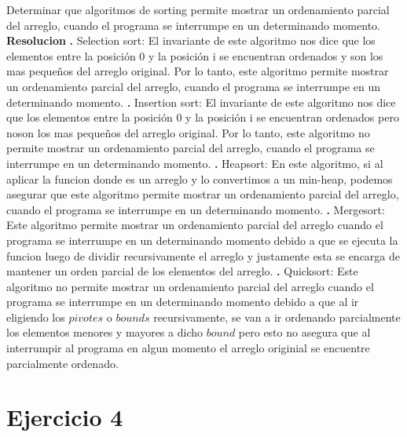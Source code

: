\documentclass[10pt,a4paper]{article}
\begin{document}
Determinar que algoritmos de sorting permite mostrar un ordenamiento parcial del arreglo, cuando el programa se interrumpe en un determinando momento. 
\newline
\newline
\textbf{Resolucion}
\newline
\newline
\textbf{.} Selection sort: El invariante de este algoritmo nos dice que los elementos entre la posición 0 y la posición i se encuentran ordenados y son los mas pequeños del arreglo original. Por lo tanto, este algoritmo permite mostrar un ordenamiento parcial del arreglo, cuando el programa se interrumpe en un determinando momento. 
\newline
\newline
\textbf{.} Insertion sort: El invariante de este algoritmo nos dice que los elementos entre la posición 0 y la posición i se encuentran ordenados pero noson los mas pequeños del arreglo original. Por lo tanto, este algoritmo no permite mostrar un ordenamiento parcial del arreglo, cuando el programa se interrumpe en un determinando momento.
\newline
\newline
\textbf{.} Heapsort: En este algoritmo, si al aplicar la funcion  donde  es un arreglo y lo convertimos a un min-heap, podemos asegurar que este algoritmo permite mostrar un ordenamiento parcial del arreglo, cuando el programa se interrumpe en un determinando momento.
\newline
\newline
\textbf{.} Mergesort: Este algoritmo permite mostrar un ordenamiento parcial del arreglo cuando el programa se interrumpe en un determinando momento debido a que se ejecuta la funcion  luego de dividir recursivamente el arreglo y justamente esta se encarga de mantener un orden parcial de los elementos del arreglo.
\newline
\newline
\textbf{.} Quicksort: Este algoritmo no permite mostrar un ordenamiento parcial del arreglo cuando el programa se interrumpe en un determinando momento debido a que al ir eligiendo los $pivotes$ o $bounds$ recursivamente, se van a ir ordenando parcialmente los elementos menores y mayores a dicho $bound$ pero esto no asegura que al interrumpir al programa en algun momento el arreglo originial se encuentre parcialmente ordenado.
\newpage

\section{Ejercicio 4}
\end{document}
